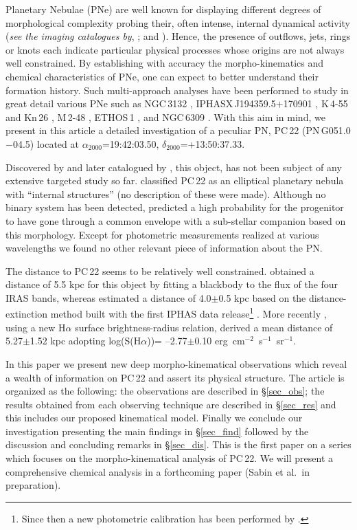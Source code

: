 \documentclass[fleqn,usenatbib,useAMS]{mnras}
\begin{document}
Planetary Nebulae (PNe) are well known for displaying different degrees
of morphological complexity probing their, often intense, internal
dynamical activity ({\it see the imaging catalogues by}, \citealt{Parker2006,Parker2016}; \citealt{Sahai2011} and \citealt{Sabin2014}).
Hence, the presence of outflows, jets, rings or knots each indicate
particular physical processes whose origins are not always well
constrained.
By establishing with accuracy the morpho-kinematics and chemical
characteristics of PNe, one can expect to better understand their
formation history. 
Such multi-approach analyses have been performed to study in great detail
various PNe such as NGC\,3132 \citep{Monteiro2000}, IPHASX\,J194359.5$+$170901
\citep{Corradi2011}, K\,4-55 and Kn\,26 \citep[respectively]{Guerrero1996,
Guerrero2013}, M\,2-48 \citep{lopez-martin2002}, ETHOS\,1
\citep{Miszalski2011}, and NGC\,6309 \citep{Vazquez2008}.  
With this aim in mind, we present in this article a detailed investigation
of a peculiar PN, PC\,22 (PN\,G051.0$-$04.5) located at $\alpha_{2000}$=19:42:03.50, $\delta_{2000}$=+13:50:37.33.


Discovered by \citet{Apriamashvili1959} and later catalogued by
\citet{Peimbert1961}, this object, has not been subject of any extensive targeted study so
far.  
\citet{Manchado1996} classified PC\,22 as an elliptical planetary nebula
with ``internal structures'' (no description of these were made).
Although no binary system has been detected, \citet{Soker1997} predicted
a high probability for the progenitor to have gone through a common envelope with a sub-stellar
companion based on this morphology.
Except for photometric measurements realized at various wavelengths we
found no other relevant piece of information about the PN. 


The distance to PC\,22 seems to be relatively well constrained.
\citet{Tajitsu1998} obtained a distance of 5.5 kpc for this object by
fitting a blackbody to the flux of the four IRAS bands, whereas
\citet{Giammanco2011} estimated a distance of 4.0$\pm$0.5 kpc based on
the distance-extinction method built with the first IPHAS data
release\footnote{
Since then a new photometric calibration has been performed by
\citet{Barentsen2014}.
}
. More recently \citet{Frew2016}, using a new H$\alpha$ surface
brightness-radius relation, derived a mean distance of 5.27$\pm$1.52 kpc
adopting log(S(H$\alpha$))= --2.77$\pm$0.10 erg~cm$^{-2}$~s$^{-1}$~sr$^{-1}$.  


In this paper we present new deep morpho-kinematical observations which
reveal a wealth of information on PC\,22 and assert its physical structure.
The article is organized as the following:
the observations are described in \S\ref{sec_obs};
the results obtained from each observing technique are described in
\S\ref{sec_res} and this includes our proposed kinematical model.
Finally we conclude our investigation presenting the main findings in \S\ref{sec_find} followed by the discussion and concluding remarks in \S\ref{sec_dis}.
This is the first paper on a series which focuses on the morpho-kinematical
analysis of PC\,22.
We will present a comprehensive chemical analysis in a forthcoming paper
(Sabin et al.\ in preparation).
\end{document}
